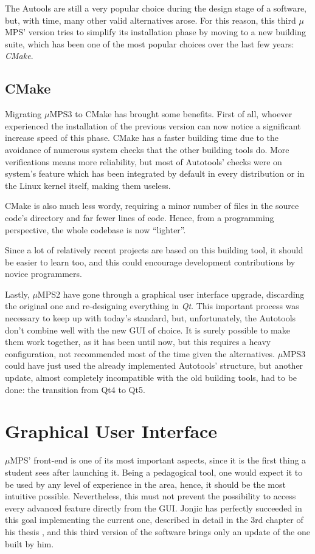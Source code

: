 \documentclass[12pt,a4paper,openright,twoside]{report}
\begin{document}
The Autools are still a very popular choice during the design stage of a software, but, with time, many other valid alternatives arose.
For this reason, this third $\mu$MPS' version tries to simplify its installation phase by moving to a new building suite, which has been one of the most popular choices over the last few years: \textit{CMake}.

\subsection{CMake}
Migrating $\mu$MPS3 to CMake has brought some benefits.
First of all, whoever experienced the installation of the previous version can now notice a significant increase speed of this phase.
CMake has a faster building time due to the avoidance of numerous system checks that the other building tools do.
More verifications means more reliability, but most of Autotools' checks were on system's feature which has been integrated by default in every distribution or in the Linux kernel itself, making them useless.

CMake is also much less wordy, requiring a minor number of files in the source code's directory and far fewer lines of code.
Hence, from a programming perspective, the whole codebase is now ``lighter''.

Since a lot of relatively recent projects are based on this building tool, it should be easier to learn too, and this could encourage development contributions by novice programmers.

Lastly, $\mu$MPS2 have gone through a graphical user interface upgrade, discarding the original one and re-designing everything in \textit{Qt}.
This important process was necessary to keep up with today's standard, but, unfortunately, the Autotools don't combine well with the new GUI of choice.
It is surely possible to make them work together, as it has been until now, but this requires a heavy configuration, not recommended most of the time given the alternatives.
$\mu$MPS3 could have just used the already implemented Autotools' structure, but another update, almost completely incompatible with the old building tools, had to be done: the transition from Qt4 to Qt5.

\section{Graphical User Interface}
$\mu$MPS' front-end is one of its most important aspects, since it is the first thing a student sees after launching it.
Being a pedagogical tool, one would expect it to be used by any level of experience in the area, hence, it should be the most intuitive possible.
Nevertheless, this must not prevent the possibility to access every advanced feature directly from the GUI.
Jonjic has perfectly succeeded in this goal implementing the current one, described in detail in the 3rd chapter of his thesis \cite{tjonjic}, and this third version of the software brings only an update of the one built by him.
\end{document}
